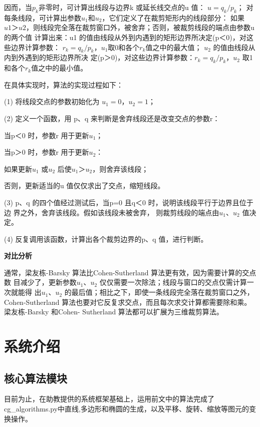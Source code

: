 \documentclass[a4paper,UTF8]{article}
\theoremstyle{definition}
\begin{document}
因而，当$p_k$非零时，可计算出线段与边界k 或延长线交点的u 值：
$u=q_k/p_k$；
对每条线段，可计算出参数$u_1$和$u_2$，它们定义了在裁剪矩形内的线段部分：
如果$u1＞u2$，则线段完全落在裁剪窗口外，被舍弃；否则，被裁剪线段的端点由参数u 的两个值
计算出来：u1 的值由线段从外到内遇到的矩形边界所决定(p＜0)，对这些边界计算参数：
$r_k=q_k/p_k$，$u_1$取0和各个$r_k$值之中的最大值；
$u_2$ 的值由线段从内到外遇到的矩形边界所决
定(p＞0)，对这些边界计算参数：$r_k=q_k/p_k$，$u_2$ 取1和各个$r_k$值之中的最小值。

在具体实现时，算法的实现过程如下：

(1) 将线段交点的参数初始化为 $u_1=0，u_2=1$；

(2) 定义一个函数，用 p、q 来判断是舍弃线段还是改变交点的参数r：

    当p＜0 时，参数r 用于更新$u_1$；

    当p＞0 时，参数r 用于更新$u_2$：

    如果更新$u_1$ 或$u_2$ 后使$u_1＞u_2$，则舍弃该线段；

    否则，更新适当的u 值仅仅求出了交点，缩短线段。

(3) p、q 的四个值经过测试后，当p=0 且q＜0 时，说明该线段平行于边界且位于边
界之外，舍弃该线段。假如该线段未被舍弃，
则裁剪线段的端点由$u_1、u_2$ 值决定。

(4) 反复调用该函数，计算出各个裁剪边界的p、q 值，进行判断。\cite{move}

\textbf{对比分析}\par
通常，梁友栋-Barsky 算法比Cohen-Sutherland 算法更有效，因为需要计算的交点数
目减少了，更新参数$u_1、u_2$ 仅仅需要一次除法；线段与窗口的交点仅需计算一次就能得
出$u_1、u_2$ 的最后值；相比之下，即使一条线段完全落在裁剪窗口之外，Cohen-Sutherland
算法也要对它反复求交点，而且每次求交计算都需要除和乘。梁友栋-Barsky 和Cohen-
Sutherland 算法都可以扩展为三维裁剪算法。\cite{move}

\section{系统介绍}
\subsection{核心算法模块}
目前为止，在助教提供的系统框架基础上，运用前文中的算法完成了cg\_algorithms.py中直线,多边形和椭圆的生成，以及平移、旋转、缩放等图元的变换操作。
\end{document}
